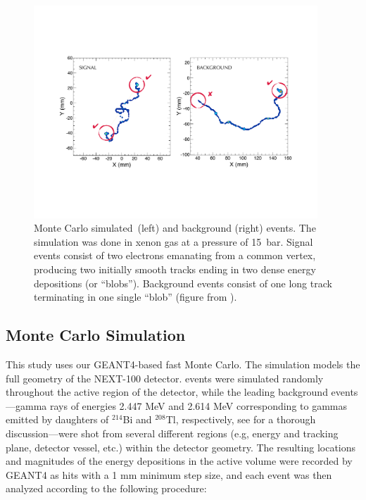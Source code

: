 \documentclass[a4paper,11pt]{article}
\begin{document}
\begin{figure}[!htb]
	\centering
	\includegraphics[width= 0.95\textwidth]{fig/TrackSignature.pdf}
	\caption{Monte Carlo simulated \bbonu\,(left) and background (right) events.  The simulation was done in xenon gas at a pressure of 15~bar. Signal events consist of two electrons emanating
		from a common vertex, producing two initially smooth tracks ending in two dense energy depositions (or ``blobs'').  Background events consist of one long track terminating in one
		single ``blob'' (figure from \cite{MartinAlbo_thesis}).} \label{fig.ETRK2}
\end{figure}

\subsection{Monte Carlo Simulation}\label{ssec:NEXT100MC}
This study uses our GEANT4-based \cite{GEANT4} fast Monte Carlo. The simulation models the full geometry of the NEXT-100 detector.   \bbonu events were
simulated randomly throughout the active region of the detector, while the leading background events---gamma rays of energies 2.447 MeV and 2.614 MeV corresponding to gammas emitted by daughters of $^{214}$Bi and $^{208}$Tl,
respectively, see \cite{Martin-Albo:2015rhw} for a thorough discussion---were shot from several different regions (e.g, energy and tracking plane, detector vessel, etc.) within the detector geometry. 
The resulting locations and magnitudes of the energy depositions in the active volume were recorded by GEANT4 as hits with a 1 mm minimum step size, and each event was then
analyzed according to the following procedure:
\end{document}
